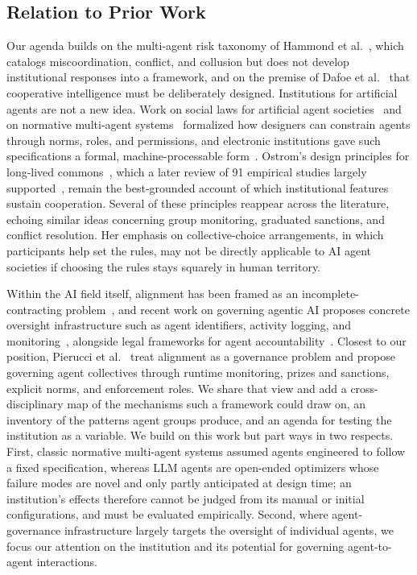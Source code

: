 \documentclass[runningheads]{llncs}
\begin{document}
\subsection{Relation to Prior Work}
Our agenda builds on the multi-agent risk taxonomy of Hammond et al.~\mbox{\citep{hammond2025multiagentrisksadvancedai}}, which catalogs miscoordination, conflict, and collusion but does not develop institutional responses into a framework, and on the premise of Dafoe et al.~\mbox{\citep{dafoe2021cooperative}} that cooperative intelligence must be deliberately designed.
Institutions for artificial agents are not a new idea. Work on social laws for artificial agent societies~\mbox{\citep{shoham1995sociallaws}} and on normative multi-agent systems~\mbox{\citep{boella2006normative}} formalized how designers can constrain agents through norms, roles, and permissions, and electronic institutions gave such specifications a formal, machine-processable form~\mbox{\citep{esteva2001electronic}}.
Ostrom's design principles for long-lived commons~\mbox{\citep{ostromGoverningCommonsEvolution1990}}, which a later review of 91 empirical studies largely supported~\mbox{\citep{cox2010designprinciples}}, remain the best-grounded account of which institutional features sustain cooperation. Several of these principles reappear across the literature, echoing similar ideas concerning group monitoring, graduated sanctions, and conflict resolution. Her emphasis on collective-choice arrangements, in which participants help set the rules, may not be directly applicable to AI agent societies if choosing the rules stays squarely in human territory.

Within the AI field itself, alignment has been framed as an incomplete-contracting problem~\mbox{\citep{hadfieldmenell2019incomplete}}, and recent work on governing agentic AI proposes concrete oversight infrastructure such as agent identifiers, activity logging, and monitoring~\mbox{\citep{chan2025infrastructure}}, alongside legal frameworks for agent accountability~\mbox{\citep{kolt2026governingaiagents}}. Closest to our position, Pierucci et al.~\mbox{\citep{pierucci2026institutionalai}} treat alignment as a governance problem and propose governing agent collectives through runtime monitoring, prizes and sanctions, explicit norms, and enforcement roles. We share that view and add a cross-disciplinary map of the mechanisms such a framework could draw on, an inventory of the patterns agent groups produce, and an agenda for testing the institution as a variable.
We build on this work but part ways in two respects. First, classic normative multi-agent systems assumed agents engineered to follow a fixed specification, whereas LLM agents are open-ended optimizers whose failure modes are novel and only partly anticipated at design time; an institution's effects therefore cannot be judged from its manual or initial configurations, and must be evaluated empirically. Second, where agent-governance infrastructure largely targets the oversight of individual agents, we focus our attention on the institution and its potential for governing agent-to-agent interactions.
\end{document}

